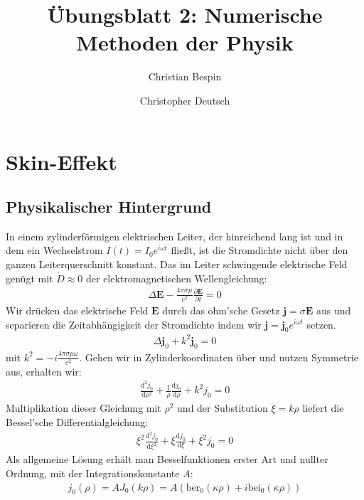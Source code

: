 \documentclass[10pt,a4paper]{article}
\author{Christian Bespin \and Christopher Deutsch}
\title{Übungsblatt 2: Numerische Methoden der Physik}
\begin{document}
\maketitle

\setcounter{section}{1}

\section{Skin-Effekt}

\subsection{Physikalischer Hintergrund}

In einem zylinderförmigen elektrischen Leiter, der hinreichend lang ist und in dem ein Wechselstrom $I(t)=I_0 e^{i \omega t}$ fließt, ist die Stromdichte nicht über den ganzen Leiterquerschnitt konstant. Das im Leiter schwingende elektrische Feld genügt mit $\dot D \approx 0$ der elektromagnetischen Wellengleichung:
\begin{align}
	\Delta\mathbf{E} - \frac{4\pi\sigma\mu}{c^2} \frac{\partial \mathbf{E}}{\partial t} = 0
	\label{eq:maxwellgleichung}
\end{align}
Wir drücken das elektrische Feld $\mathbf{E}$ durch das ohm'sche Gesetz $\mathbf{j} = \sigma \mathbf{E}$ aus und separieren die Zeitabhängigkeit der Stromdichte \cite{healdmarion} indem wir $\mathbf{j} = \mathbf{j}_0 e^{i \omega t}$ setzen.
\begin{align}
	\Delta\mathbf{j}_0 + k^2 \mathbf{j}_0 = 0
	\label{eq:maxwellgleichungJ}
\end{align}
mit $k^2 = - i \frac{4 \pi \sigma \mu \omega}{c^2}$. Gehen wir in Zylinderkoordinaten über und nutzen Symmetrie aus, erhalten wir:
\begin{align}
	\frac{\mathrm{d}^2 j_0}{\mathrm{d}\rho^2} + \frac{1}{\rho}\frac{\mathrm{d}j_0}{\mathrm{d}\rho} + k^2 j_0 = 0
	\label{eq:besseldgl} 
\end{align}
Multiplikation dieser Gleichung mit $\rho^2$ und der Substitution $\xi = k \rho$ liefert die Bessel'sche Differentialgleichung:
\begin{align}
  \xi^2 \frac{\mathrm{d}^2j_0}{\mathrm{d}\xi^2} + \xi \frac{\mathrm{d}j_0}{\mathrm{d}\xi} + \xi^2 j_0 = 0
\end{align}
Als allgemeine Lösung erhält man Besselfunktionen erster Art und nullter Ordnung, mit der Integrationskonstante $A$:
\begin{align}
	j_0(\rho)=A J_0(k \rho) = A(\mathrm{ber}_0(\kappa \rho)+i\mathrm{bei}_0(\kappa \rho))
\end{align}
\end{document}
